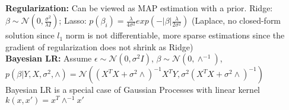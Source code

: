 \\
\textbf{Regularization: } 
Can be viewed as MAP estimation with a prior. Ridge: $\beta \sim \mathcal{N}(0, \frac{\sigma^2}{\lambda I})$; Lasso: $p(\beta_i) = \frac{\lambda}{4 \sigma^2}exp(-|\beta|\frac{\lambda}{2\sigma^2})$ (Laplace, no closed-form solution since $l_1$ norm is not differentiable, more sparse estimations since the gradient of regularization does not shrink as Ridge)
\\
\textbf{Bayesian LR: } 
Assume $\epsilon \sim \mathcal{N}(0, \sigma^2 I)$, $\beta \sim \mathcal{N}(0, \wedge^{-1})$, $p(\beta|Y,X,\sigma^2, \wedge) = \mathcal{N}((X^TX+\sigma^2\wedge)^{-1}X^TY, \sigma^2(X^TX+\sigma^2 \wedge)^{-1})$ \\
Bayesian LR is a special case of Gaussian Processes with linear kernel $k(x, x') = x^T\wedge^{-1} x'$